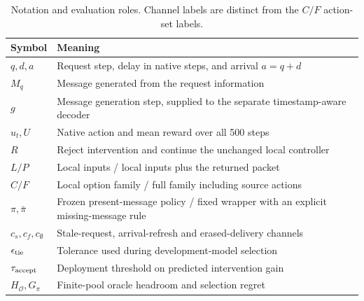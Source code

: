\documentclass[10pt,a4paper]{article}
\begin{document}
\setcounter{table}{1}
\begin{table}[H]\centering\small
\caption{Notation and evaluation roles. Channel labels are distinct from the $C/F$ action-set labels.}
\begin{tabular}{lp{}}\toprule
Symbol & Meaning\\\midrule
$q,d,a$ & Request step, delay in native steps, and arrival $a=q+d$\\
$M_q$ & Message generated from the request information\\
$g$ & Message generation step, supplied to the separate timestamp-aware decoder\\
$u_t,U$ & Native action and mean reward over all 500 steps\\
$R$ & Reject intervention and continue the unchanged local controller\\
$L/P$ & Local inputs / local inputs plus the returned packet\\
$C/F$ & Local option family / full family including source actions\\
$\pi,\bar\pi$ & Frozen present-message policy / fixed wrapper with an explicit missing-message rule\\
$c_s,c_f,c_\emptyset$ & Stale-request, arrival-refresh and erased-delivery channels\\
$\epsilon_{\rm tie}$ & Tolerance used during development-model selection\\
$\tau_{\rm accept}$ & Deployment threshold on predicted intervention gain\\
$H_{\mathcal O},G_\pi$ & Finite-pool oracle headroom and selection regret\\\bottomrule
\end{tabular}\end{table}
\end{document}
